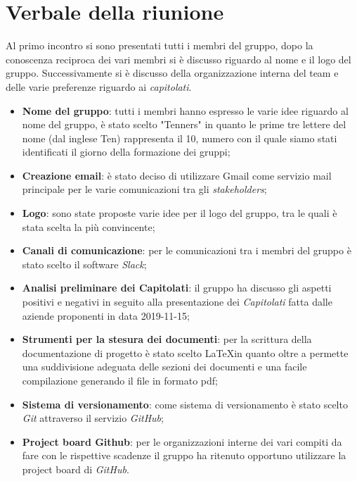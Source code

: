 \section{Verbale della riunione}
		Al primo incontro si sono presentati tutti i membri del gruppo, dopo la conoscenza reciproca dei vari membri si è discusso riguardo al nome e il logo del gruppo. Successivamente si è discusso della organizzazione interna del team e delle varie preferenze riguardo ai \textit{capitolati\glos}. 
	\begin{itemize}
		\item \textbf {Nome del gruppo}: tutti i membri hanno espresso le varie idee riguardo al nome del gruppo, è stato scelto "Tenners" in quanto le prime tre lettere del nome (dal inglese Ten) rappresenta il 10, numero con il quale siamo stati identificati il giorno della formazione dei gruppi;
		\item \textbf {Creazione email}: è stato deciso di utilizzare Gmail come servizio mail principale per le varie comunicazioni tra gli \textit{stakeholders\glos};
		\item \textbf {Logo}: sono state proposte varie idee per il logo del gruppo, tra le quali è stata scelta la più convincente;
		\item \textbf {Canali di comunicazione}: per le comunicazioni tra i membri del gruppo è stato scelto il software \textit{Slack\glos};
		\item \textbf {Analisi preliminare dei Capitolati\glos}: il gruppo ha discusso gli aspetti positivi e negativi in seguito alla presentazione dei \textit{Capitolati\glo} fatta dalle aziende proponenti in data 2019-11-15;
		\item \textbf {Strumenti per la stesura dei documenti}: per la scrittura della documentazione di progetto è stato scelto \LaTeX  in quanto oltre a permette una suddivisione adeguata delle sezioni dei documenti e una facile compilazione generando il file in formato pdf;
		\item \textbf {Sistema di versionamento}: come sistema di versionamento è stato scelto \textit{Git\glo} attraverso il servizio \textit{GitHub\glos};
		\item \textbf {Project board Github\glos}: per le organizzazioni interne dei vari compiti da fare con le rispettive scadenze il gruppo ha ritenuto opportuno utilizzare la project board di \textit{GitHub\glos}.
	\end{itemize}


